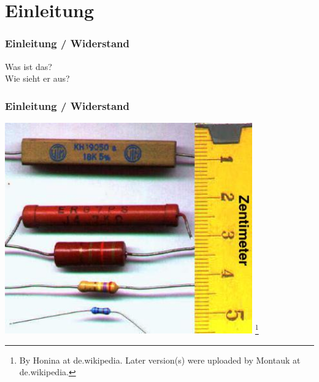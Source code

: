 

\subtitle{Technik Klasse E 04: \\
          Der Widerstand und seine Schaltungsarten \\[2em]}
\date{Stand 06.11.2014}



\section*{Einleitung}

\begin{frame}
    \frametitle{Einleitung / Widerstand}
    \begin{center}
        \Large{Was ist das?} \\
        \Large{Wie sieht er aus?}
    \end{center}
\end{frame}


\begin{frame}
    \frametitle{Einleitung / Widerstand}

    \begin{center}
        \includegraphics[width=0.8\textwidth]{e04/Widerstaende.jpg}
        \footnote{\tiny By Honina at de.wikipedia. Later version(s) were uploaded by Montauk at de.wikipedia.}
    \end{center}
 	

\end{frame}

